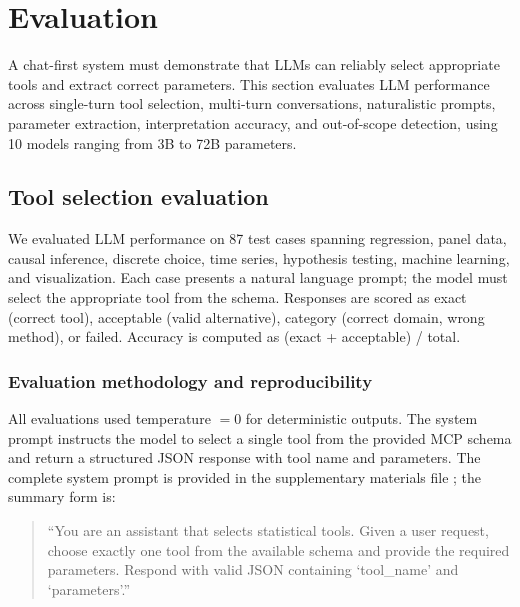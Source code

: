 
\section{Evaluation} \label{sec:evaluation}

A chat-first system must demonstrate that LLMs can reliably select
appropriate tools and extract correct parameters. This section evaluates
LLM performance across single-turn tool selection, multi-turn conversations,
naturalistic prompts, parameter extraction, interpretation accuracy, and
out-of-scope detection, using 10 models ranging from 3B to 72B parameters.

\subsection{Tool selection evaluation}

We evaluated LLM performance on 87 test cases spanning regression, panel data,
causal inference, discrete choice, time series, hypothesis testing, machine
learning, and visualization. Each case presents a natural language prompt; the
model must select the appropriate tool from the  schema.
Responses are scored as exact (correct tool), acceptable (valid alternative),
category (correct domain, wrong method), or failed. Accuracy is computed as
(exact + acceptable) / total.

\subsubsection{Evaluation methodology and reproducibility}

All evaluations used temperature $= 0$ for deterministic outputs. The system
prompt instructs the model to select a single tool from the provided MCP schema
and return a structured JSON response with tool name and parameters. The
complete system prompt is provided in the supplementary materials file
; the summary form is:

\begin{quote}
\small
``You are an assistant that selects statistical tools. Given a user request,
choose exactly one tool from the available schema and provide the required
parameters. Respond with valid JSON containing `tool\_name' and `parameters'.''
\end{quote}

